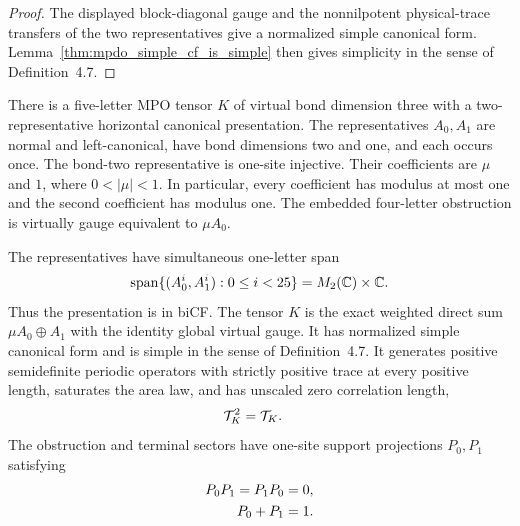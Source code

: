 \begin{proof}\leanok
    The displayed block-diagonal gauge and the nonnilpotent physical-trace
    transfers of the two representatives give a normalized simple canonical
    form. Lemma~\ref{thm:mpdo_simple_cf_is_simple} then gives simplicity in
    the sense of Definition~4.7.
\end{proof}

\begin{lemma}
    \label{thm:mpdo_neighboring_trace_obstruction_ambient_properties}
    \leanok
    There is a five-letter MPO tensor $K$ of virtual bond dimension three
    with a two-representative horizontal canonical presentation. The
    representatives $A_0,A_1$ are normal and left-canonical, have bond
    dimensions two and one, and each occurs once. The bond-two representative
    is one-site injective. Their coefficients are $\mu$ and $1$, where
    $0<|\mu|<1$. In particular, every coefficient has modulus at most one and
    the second coefficient has modulus one. The embedded four-letter
    obstruction is virtually gauge equivalent to $\mu A_0$.

    The representatives have simultaneous one-letter span
    \begin{align}
        \operatorname{span}\{(A_0^i,A_1^i):0\leq i<25\}
        =M_2(\mathbb C)\times\mathbb C.
        \notag
    \end{align}
    Thus the presentation is in biCF. The tensor $K$ is the exact weighted
    direct sum $\mu A_0\oplus A_1$ with the identity global virtual gauge. It
    has normalized simple canonical form and is simple in the sense of
    Definition~4.7. It generates positive
    semidefinite periodic operators with strictly positive trace at every
    positive length, saturates the area law, and has unscaled zero correlation
    length,
    \begin{align}
        \mathcal T_K^2 & =\mathcal T_K.
        \notag
    \end{align}
    The obstruction and terminal sectors have one-site support projections
    $P_0,P_1$ satisfying
    \begin{align}
        P_0P_1=P_1P_0 & =0, \notag \\
        P_0+P_1       & =1. \notag
    \end{align}
\end{lemma}

